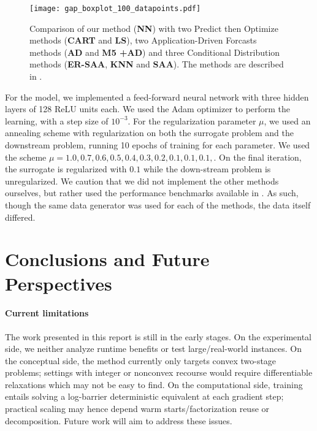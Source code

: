 \documentclass{article}
\begin{document}
\begin{figure}[h]
        \centering
        \texttt{[image: gap\_boxplot\_100\_datapoints.pdf]}
        \caption{Comparison of our method (\textbf{NN}) with two Predict then Optimize methods (\textbf{CART} and \textbf{LS}), two Application-Driven Forcasts methods (\textbf{AD} and \textbf{M5 +AD}) and three Conditional Distribution methods (\textbf{ER-SAA}, \textbf{KNN} and \textbf{SAA}). The methods are described in \cite{homem-de-melloForecastingOutsideBox2024}.}
        \label{fig:plot}
\end{figure}

For the model, we implemented a feed-forward neural network with three hidden layers of 128 ReLU units each. We used the Adam optimizer to perform the learning, with a step size of $10^{-3}$. For the regularization parameter $\mu$, we used an annealing scheme with regularization on both the surrogate problem and the downstream problem, running 10 epochs of training for each parameter. We used the scheme  $\mu = 1.0, 0.7, 0.6, 0.5, 0.4, 0.3, 0.2, 0.1, 0.1, 0.1, $. On the final iteration, the surrogate is regularized with $0.1$ while the down-stream problem is unregularized. We caution that we did not implement the other methods ourselves, but rather used the performance benchmarks available in \cite{homem-de-melloForecastingOutsideBox2024}. As such, though the same data generator was used for each of the methods, the data itself differed.


\section{Conclusions and Future Perspectives}



\paragraph{Current limitations}
The work presented in this report is still in the early stages.
On the experimental side, we neither analyze runtime benefits or test
large/real-world instances.
On the conceptual side, the method currently only targets convex two-stage
problems; settings with integer or nonconvex recourse would require
differentiable relaxations which may not be easy to find.
On the computational side, training entails solving a log-barrier deterministic
equivalent at each gradient step; practical scaling may hence depend warm
starts/factorization reuse or decomposition. Future work will aim to address these issues.



\end{document}
